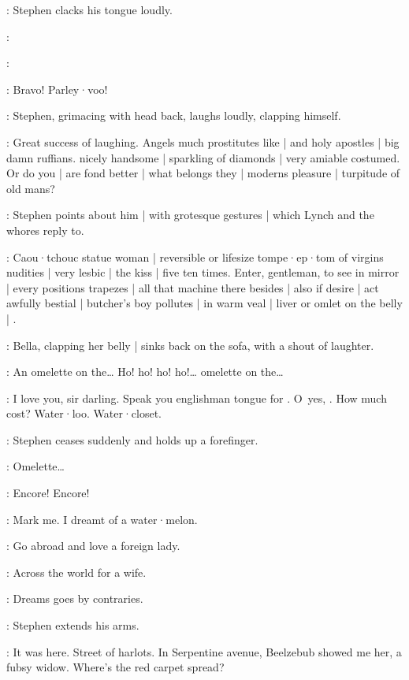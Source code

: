 :
Stephen clacks his tongue loudly.

\Stephen:

\Lynch:

\Whores:
Bravo!
Parley·voo!

:
Stephen,
grimacing with head back,
laughs loudly,
clapping himself.

\Stephen:
Great success of laughing.
Angels much prostitutes like |
and holy apostles |
big damn ruffians.
 nicely handsome |
sparkling of diamonds |
very amiable costumed.
Or do you |
are fond better |
what belongs they |
moderns pleasure |
turpitude of old mans?

:
Stephen points about him |
with grotesque gestures |
which Lynch and the whores reply to.

\Stephen:
Caou·tchouc statue woman |
reversible or lifesize tompe·ep·tom of virgins nudities |
very lesbic |
the kiss |
five ten times.
Enter,
gentleman,
to see in mirror |
every positions trapezes |
all that machine there besides |
also if desire |
act awfully bestial |
butcher's boy pollutes |
in warm veal |
liver or omlet on the belly |
.

:
Bella,
clapping her belly |
sinks back on the sofa,
with a shout of laughter.

\Bella:
An omelette on the…
Ho!
ho!
ho!
ho!…
omelette on the…

\Stephen:
I love you,
sir darling.
Speak you englishman tongue for .
O~yes,
.
How much cost?
Water·loo.
Water·closet.

:
Stephen ceases suddenly and holds up a forefinger.

\Bella:
Omelette…

\Whores:
Encore!
Encore!

\Stephen:
Mark me.
I dreamt of a water·melon.

\Zoe:
Go abroad and love a foreign lady.

\Lynch:
Across the world for a wife.

\Florry:
Dreams goes by contraries.

:
Stephen extends his arms.

\Stephen:
It was here.
Street of harlots.
In Serpentine avenue,
Beelzebub showed me her,
a fubsy widow.
Where's the red carpet spread?

